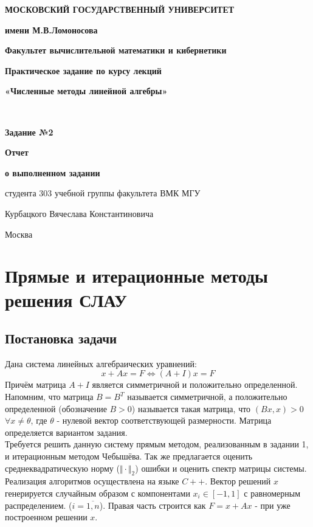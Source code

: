 \documentclass[a4paper,12pt,titlepage,final]{article}
\begin{document}
\begin{titlepage}
\centering\noindent
{
\begin{minipage}{0.1\textwidth}

\end{minipage}
\hfill
\begin{minipage}{0.77\textwidth}
\begin{center}
\textbf{МОСКОВСКИЙ ГОСУДАРСТВЕННЫЙ УНИВЕРСИТЕТ}\par
\textbf{имени М.В.Ломоносова}\par
\end{center}
\end{minipage}
\hfill
\begin{minipage}{0.1\textwidth}

\end{minipage}
}\par
{
\textbf{Факультет вычислительной математики и кибернетики}\par
\nointerlineskip
\noindent\makebox[\linewidth]{\rule{\textwidth}{0.4pt}}
}
\vfill
{
\Large{\textbf{Практическое задание по курсу лекций}}\par
\Large{\textbf{«Численные методы линейной алгебры»}}\par
}\\
{
\Large{\textbf{Задание №2}}\par
}
{
\Large{\textbf{Отчет}}\par
\Large{\textbf{о выполненном задании}}\par
\Large{студента 303 учебной группы факультета ВМК МГУ}\par
\Large{Курбацкого Вячеслава Константиновича}\par
}
\vfill
{\small Москва\\ \the\year{}}
\end{titlepage}
\tableofcontents
\newpage
\section{Прямые и итерационные методы решения СЛАУ}
\subsection{Постановка задачи}
Дана система линейных алгебраических уравнений:
$$x + Ax = F \Leftrightarrow (A + I)x = F$$
Причём матрица $A + I$ является симметричной и положительно определенной. Напомним, что матрица $B = B^T$ называется симметричной, а положительно определенной (обозначение $B > 0$) называется такая матрица, что $(Bx, x) > 0$ $\forall x \neq \theta$, где $\theta$ - нулевой вектор соответствующей размерности. Матрица определяется вариантом задания. \\
Требуется решить данную систему прямым методом, реализованным в задании 1, и итерационным методом Чебышёва. Так же предлагается оценить среднеквадратическую норму ($\Vert \cdot \Vert_2$) ошибки и оценить спектр матрицы системы. Реализация алгоритмов осуществлена на языке $C++$. Вектор решений $x$ генерируется случайным образом с компонентами $x_i \in [-1, 1]$ с равномерным распределением. ($i = \overline{1, n}$). Правая часть строится как $F = x + Ax$ - при уже построенном решении $x$.
\end{document}
